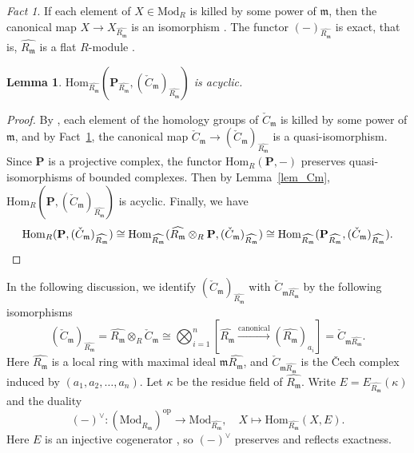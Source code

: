 \documentclass[11pt]{amsart}
\newtheorem{lemma}[theorem]{Lemma}
\theoremstyle{remark}
\newtheorem{fact}[theorem]{Fact}
\begin{document}
\begin{fact}\label{fact}
If each element of $X \in \mathrm{Mod}_R$ is killed by some power of $\mathfrak m$, then the canonical map $X \to X_{\widehat{R_\mathfrak m}}$ is an isomorphism \cite[Lemme~1]{BeauvilleLaszlo}. The functor $(-)_{\widehat{R_\mathfrak m}}$ is exact, that is, $\widehat{R_\mathfrak m}$ is a flat $R$-module \cite[Proposition~10.14]{AtiyahMacdonald}.
\end{fact}

\begin{lemma}\label{lem_vCm}
$\mathrm{Hom}_{\widehat{R_\mathfrak m}}(\mathbf P_{\widehat{R_\mathfrak m}}, (\check C_{\mathfrak m})_{\widehat{R_\mathfrak m}})$ is acyclic.
\end{lemma}

\begin{proof}
By \cite[Theorem~5.1.20]{brodmann-sharp}, each element of the homology groups of $\check C_{\mathfrak m}$ is killed by some power of $\mathfrak m$, and by Fact~\ref{fact}, the canonical map $\check C_{\mathfrak m} \to (\check C_{\mathfrak m})_{\widehat{R_\mathfrak m}}$ is a quasi-isomorphism. Since $\mathbf{P}$ is a projective complex, the functor $\mathrm{Hom}_R(\mathbf P, -)$ preserves quasi-isomorphisms of bounded complexes. Then by Lemma~\ref{lem_Cm}, $ \mathrm{Hom}_R(\mathbf P, (\check C_{\mathfrak m})_{\widehat{R_\mathfrak m}})$ is acyclic. Finally, we have
\begin{equation*}
\mathrm{Hom}_R(\mathbf P, (\check C_{\mathfrak m})_{\widehat{R_\mathfrak m}}) \cong 
\mathrm{Hom}_{\widehat{R_\mathfrak m}}(\widehat{R_\mathfrak m} \otimes_{R} \mathbf P, (\check C_{\mathfrak m})_{\widehat{R_\mathfrak m}}) \cong 
\mathrm{Hom}_{\widehat{R_\mathfrak m}}(\mathbf P_{\widehat{R_\mathfrak m}}, (\check C_{\mathfrak m})_{\widehat{R_\mathfrak m}}) .\qedhere
\end{equation*}
\end{proof}

In the following discussion, we identify $(\check C_{\mathfrak m})_{\widehat{R_\mathfrak m}}$ with $\check C_{\mathfrak m \widehat{R_\mathfrak m}}$ by the following isomorphisms
\begin{equation*}
(\check C_{\mathfrak m})_{\widehat{R_\mathfrak m}} = \widehat{R_\mathfrak m}\otimes _R \check C_{\mathfrak m}  \cong \bigotimes_{i=1}^n [\widehat{R_\mathfrak m} \xrightarrow{\text{canonical}} (\widehat{R_\mathfrak m})_{a_i}] = \check C_{\mathfrak m \widehat{R_\mathfrak m}}.
\end{equation*}
Here $\widehat{R_\mathfrak m}$ is a local ring with maximal ideal $\mathfrak{m}\widehat{R_\mathfrak m}$, and $\check C_{\mathfrak m \widehat{R_\mathfrak m}}$ is the \v Cech complex induced by $(a_1,a_2,\ldots,a_n)$. Let $\kappa$ be the residue field of $\widehat{R_\mathfrak m}$.
Write $E = E_{\widehat{R_\mathfrak m}}(\kappa)$ and the duality
\begin{equation*}
(-)^\vee : (\mathrm{Mod}_{\widehat{R_\mathfrak m}})^{\mathrm{op}} \to \mathrm{Mod}_{\widehat{R_\mathfrak m}}, \quad X \mapsto \mathrm{Hom}_{\widehat{R_\mathfrak m}}(X, E).
\end{equation*}
Here $E$ is an injective cogenerator \cite[p.~528]{matlis}, so $(-)^\vee$ preserves and reflects exactness.
\end{document}
